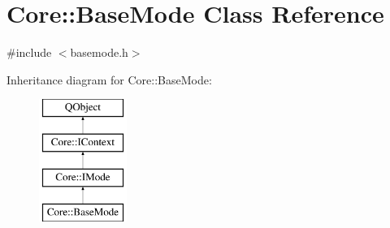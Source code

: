 \hypertarget{class_core_1_1_base_mode}{\section{Core\-:\-:Base\-Mode Class Reference}
\label{class_core_1_1_base_mode}
}


{\ttfamily \#include $<$basemode.\-h$>$}

Inheritance diagram for Core\-:\-:Base\-Mode\-:\begin{figure}[H]
\begin{center}
\leavevmode
\includegraphics[height=4.000000cm]{class_core_1_1_base_mode}
\end{center}
\end{figure}
